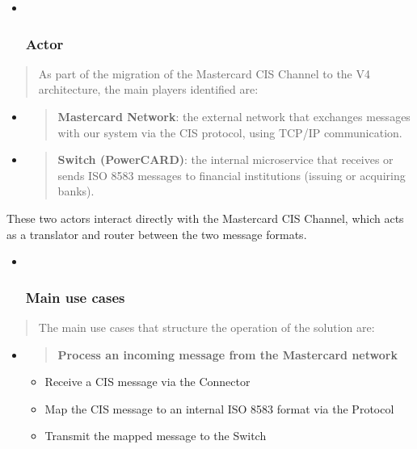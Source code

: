 \documentclass[12pt,a4paper]{report}
\begin{document}
\begin{itemize}
\item ~
  \hypertarget{actor}{%
  \subsubsection{\texorpdfstring{\textbf{Actor}}{Actor}}\label{actor}}
\end{itemize}

\begin{quote}
As part of the migration of the Mastercard CIS Channel to the V4
architecture, the main players identified are:
\end{quote}

\begin{itemize}
\item
  \begin{quote}
  \textbf{Mastercard Network}: the external network that exchanges
  messages with our system via the CIS protocol, using TCP/IP
  communication.
  \end{quote}
\item
  \begin{quote}
  \textbf{Switch (PowerCARD)}: the internal microservice that receives
  or sends ISO 8583 messages to financial institutions (issuing or
  acquiring banks).
  \end{quote}
\end{itemize}

These two actors interact directly with the Mastercard CIS Channel,
which acts as a translator and router between the two message formats.

\begin{itemize}
\item ~
  \hypertarget{main-use-cases}{%
  \subsubsection{\texorpdfstring{\textbf{Main use
  cases}}{Main use cases}}\label{main-use-cases}}
\end{itemize}

\begin{quote}
The main use cases that structure the operation of the solution are:
\end{quote}

\begin{itemize}
\item
  \begin{quote}
  \textbf{Process an incoming message from the Mastercard network}
  \end{quote}

  \begin{itemize}
  \item
    Receive a CIS message via the Connector
  \item
    Map the CIS message to an internal ISO 8583 format via the Protocol
  \item
    Transmit the mapped message to the Switch
  \end{itemize}
\end{itemize}
\end{document}
